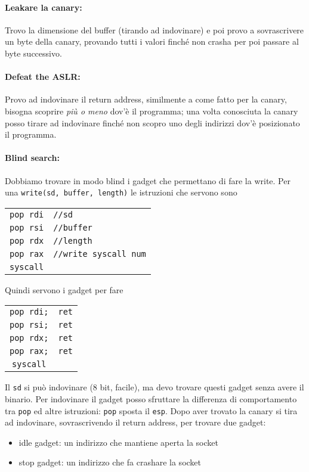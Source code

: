 \paragraph{Leakare la canary:} Trovo la dimensione del buffer (tirando ad indovinare) e poi provo a sovrascrivere un byte della canary, provando tutti i valori finché non crasha per poi passare al byte successivo.\\

\paragraph{Defeat the ASLR:} Provo ad indovinare il return address, similmente a come fatto per la canary, bisogna scoprire \textit{più o meno} dov'è il programma; una volta conosciuta la canary posso tirare ad indovinare finché non scopro uno degli indirizzi dov'è posizionato il programma.\\

\paragraph{Blind search:} Dobbiamo trovare in modo blind i gadget che permettano di fare la write. Per una \texttt{write(sd, buffer, length)} le istruzioni che servono sono

\begin{tabular}{c l}
	\texttt{pop rdi} & \texttt{//sd} \\
	\texttt{pop rsi} & \texttt{//buffer} \\
	\texttt{pop rdx} & \texttt{//length} \\
	\texttt{pop rax} & \texttt{//write syscall num} \\
	\texttt{syscall} & \\
\end{tabular}

Quindi servono i gadget per fare

\begin{tabular}{c c}
	\texttt{pop rdi;} & \texttt{ret} \\
	\texttt{pop rsi;} & \texttt{ret} \\
	\texttt{pop rdx;} & \texttt{ret} \\
	\texttt{pop rax;} & \texttt{ret} \\
	\texttt{syscall} & \\
\end{tabular}

Il \texttt{sd} si può indovinare (8 bit, facile), ma devo trovare questi gadget senza avere il binario. Per indovinare il gadget posso sfruttare la differenza di comportamento tra \texttt{pop} ed altre istruzioni: \texttt{pop} sposta il \texttt{esp}. Dopo aver trovato la canary si tira ad indovinare, sovrascrivendo il return address, per trovare due gadget:
\begin{itemize}
	\item idle gadget: un indirizzo che mantiene aperta la socket
	\item stop gadget: un indirizzo che fa crashare la socket
\end{itemize}

